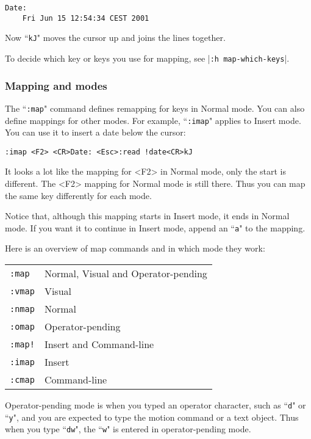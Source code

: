\begin{Verbatim}[samepage=true]
    Date:  
    Fri Jun 15 12:54:34 CEST 2001 
\end{Verbatim}

Now ``\texttt{kJ}" moves the cursor up and joins the lines together.

To decide which key or keys you use for mapping, see |\texttt{:h map-which-keys}|.

\subsubsection{Mapping and modes}
The ``\texttt{:map}" command defines remapping for keys in Normal mode.
You can also define mappings for other modes.
For example, ``\texttt{:imap}" applies to Insert mode.
You can use it to insert a date below the cursor:

\begin{Verbatim}[samepage=true]
 :imap <F2> <CR>Date: <Esc>:read !date<CR>kJ
\end{Verbatim}

It looks a lot like the mapping for <F2> in Normal mode, only the start is different.
The <F2> mapping for Normal mode is still there.
Thus you can map the same key differently for each mode.

Notice that, although this mapping starts in Insert mode, it ends in Normal mode.
If you want it to continue in Insert mode, append an ``\texttt{a}" to the mapping.

Here is an overview of map commands and in which mode they work:
\begin{center} \begin{tabular}{l l}
				\texttt{:map} & Normal, Visual and Operator-pending \\
				\texttt{:vmap} & Visual \\
				\texttt{:nmap} & Normal \\
				\texttt{:omap} & Operator-pending \\
				\texttt{:map!} & Insert and Command-line \\
				\texttt{:imap} & Insert \\
				\texttt{:cmap} & Command-line \\
\end{tabular} \end{center}

Operator-pending mode is when you typed an operator character, such as ``\texttt{d}" or ``\texttt{y}", and you are expected to type the motion command or a text object.
Thus when you type ``\texttt{dw}", the ``\texttt{w}" is entered in operator-pending mode.


